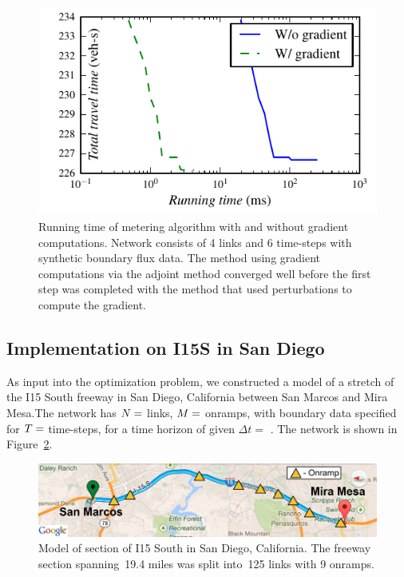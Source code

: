 \begin{figure}
	\begin{centering}
		\includegraphics[width=0.5\columnwidth]{images/itergrad}
		\par\end{centering}
				
		\caption{Running time of metering algorithm with and without gradient computations.
			Network consists of 4 links and 6 time-steps with synthetic boundary
			flux data. The method using gradient computations via the adjoint
			method converged well before the first step was completed with the
			method that used perturbations to compute the gradient.\label{fig:Running-time-of}}
		\end{figure}
				
				
				
		\subsection{Implementation on I15S in San Diego\label{sub:Network}}
				
		As input into the optimization problem, we constructed a model of
		a  stretch of the I15 South freeway in San Diego,
		California between San Marcos and Mira Mesa.The network has $N=$
		 links, $M=$ onramps,
		with boundary data specified for $T=$  time-steps,
		for a time horizon of  given $\Delta t=$ .
		The network is shown in Figure~\ref{fig:Model-of-section}.
		\begin{figure}
			\begin{centering}
				\includegraphics[width=0.7\columnwidth]{images/map}
				\par\end{centering}
								
				\caption{Model of section of I15 South in San Diego, California. The freeway
					section spanning~19.4 miles was split into~125 links with 9 onramps.\label{fig:Model-of-section}}
				\end{figure}
								
